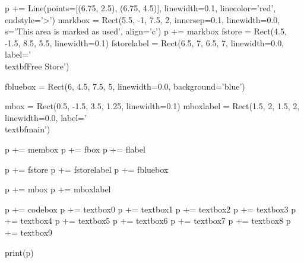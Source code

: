 \begin{python}
p += Line(points=[(6.75, 2.5), (6.75, 4.5)], linewidth=0.1, linecolor='red', endstyle='>')
markbox = Rect(5.5, -1, 7.5, 2, innersep=0.1, linewidth=0.0, s='This area is marked as used', align='c')
p += markbox
fstore = Rect(4.5, -1.5, 8.5, 5.5, linewidth=0.1)
fstorelabel = Rect(6.5, 7, 6.5, 7, linewidth=0.0, label='\\textbf{Free Store}')

fbluebox = Rect(6, 4.5, 7.5, 5, linewidth=0.0, background='blue')

mbox = Rect(0.5, -1.5, 3.5, 1.25, linewidth=0.1)
mboxlabel = Rect(1.5, 2, 1.5, 2, linewidth=0.0, label='\\textbf{main}')

p += membox
p += fbox
p += flabel

p += fstore
p += fstorelabel
p += fbluebox

p += mbox
p += mboxlabel

p += codebox
p += textbox0
p += textbox1
p += textbox2
p += textbox3
p += textbox4
p += textbox5
p += textbox6
p += textbox7
p += textbox8
p += textbox9

print(p)
\end{python}

